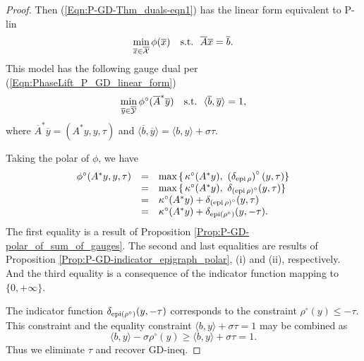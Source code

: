 \begin{proof}
Then (\ref{Eqn:P-GD-Thm_duals-eqn1}) has the linear form equivalent to P-lin
\begin{equation}
\begin{array}{rl}
\min\limits_{\substack{\overline{x} \in \overline{{\mathcal X}}}} \phi(\overline{x})
	&	\textnormal{s.t.} \ \ \overline{A}\overline{x} = \overline{b}.
\end{array}
\end{equation}
This model has the following gauge dual per (\ref{Eqn:PhaseLift_P_GD_linear_form})
\begin{equation}
\begin{array}{rl}
\min\limits_{\substack{\overline{y} \in \overline{{\mathcal Y}}}} \phi^\circ(\overline{A}^*\overline{y})
	&	\textnormal{s.t.} \ \ \langle \overline{b}, \overline{y} \rangle = 1,
\end{array}
\end{equation}
where $\overline{A}^*\overline{y} = (A^*y, y, \tau)$ and $\langle \overline{b}, \overline{y} \rangle = \langle b, y \rangle + \sigma \tau$.

Taking the polar of $\phi$, we have
\begin{equation}
\begin{array}{rcl}
\phi^\circ(A^*y, y, \tau)
	&	=	&	\max \hspace{0.05cm} \{ \hspace{0.05cm} \kappa^\circ(A^*y), \ \left( \delta_{\textnormal{epi} \hspace{0.05cm} \rho} \right)^\circ(y, \tau) \}	\\
	&	=	&	\max \hspace{0.05cm} \{ \hspace{0.05cm} \kappa^\circ(A^*y), \ \delta_{\left( \textnormal{epi} \hspace{0.05cm} \rho \right)^\circ} (y, \tau) \}	\\
	&	=	&	\kappa^\circ(A^*y) + \delta_{\left( \textnormal{epi} \hspace{0.05cm} \rho \right)^\circ}(y, \tau) \\
	&	=	&	\kappa^\circ(A^*y) + \delta_{\textnormal{epi} \left( \rho^\circ \right)} (y, -\tau).
\end{array}
\end{equation}
The first equality is a result of Proposition \ref{Prop:P-GD-polar_of_sum_of_gauges}. The second and last equalities are results of Proposition \ref{Prop:P-GD-indicator_epigraph_polar}, (i) and (ii), respectively.  And the third equality is a consequence of the indicator function mapping to $\{0, +\infty \}$.  

The indicator function $\delta_{\textnormal{epi} \left( \rho^\circ \right)} (y, -\tau)$ corresponds to the constraint $\rho^\circ(y) \leq - \tau$.  This constraint and the equality constraint $\langle b, y \rangle + \sigma \tau = 1$ may be combined as
\begin{equation*}
\langle b, y \rangle - \sigma \rho^\circ(y) \geq \langle b, y \rangle + \sigma \tau = 1.
\end{equation*}
Thus we eliminate $\tau$ and recover GD-ineq.
\end{proof}





